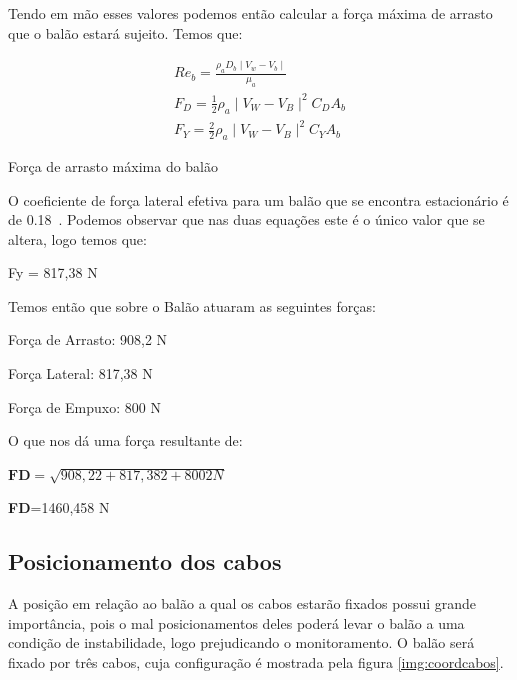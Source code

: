 	Tendo em mão esses valores podemos então calcular a força máxima de arrasto que o balão estará sujeito. Temos que:

	\begin{Equacao}[H]
		\begin{equation}
			\begin{multlined}
				Re_{b} = \frac{\rho_{a} D_{b} \mid V_{w} - V_{b} \mid}{\mu_{a}}\\
				F_{D} = \frac{1}{2} \rho_{a} \mid V_{W} - V_{B} \mid^{2} C_{D} A_{b}\\
				F_{Y} = \frac{2}{2} \rho_{a} \mid V_{W} - V_{B} \mid^{2} C_{Y} A_{b}
			\end{multlined}
		\end{equation}
		\caption{Força de arrasto máxima do balão}
		\label{eqn:forcaArrastoMax}
	\end{Equacao}

	O coeficiente de força lateral efetiva para um balão que se encontra estacionário é de 0.18~\cite{ferguson}. Podemos observar que nas duas equações este é o único valor que se altera, logo temos que:

	Fy = 817,38 N

	Temos então que sobre o Balão atuaram as seguintes forças:

	Força de Arrasto: 908,2 N

	Força Lateral: 817,38 N

	Força de Empuxo: 800 N

	O que nos dá uma força resultante de:

	$\textbf{FD}= \sqrt{908,22+ 817,382+8002N}$

	\textbf{FD}=1460,458 N

\subsection{Posicionamento dos cabos}

	A posição em relação ao balão a qual os cabos estarão fixados possui grande importância, pois o mal posicionamentos deles poderá levar o balão a uma condição de instabilidade, logo prejudicando o monitoramento. O balão será fixado por três cabos, cuja  configuração é mostrada pela figura \ref{img:coordcabos}.

